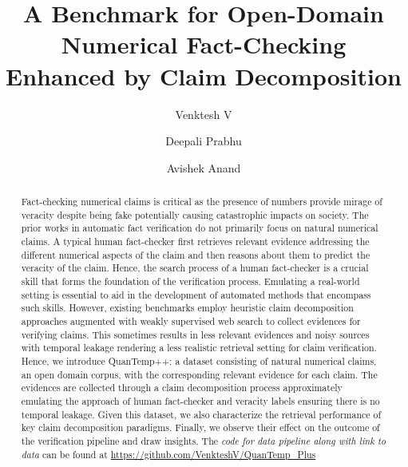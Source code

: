 \documentclass[runningheads]{llncs}
\begin{document}
%
\title{ A Benchmark for Open-Domain Numerical Fact-Checking  Enhanced by Claim Decomposition }
%
%
\author{Venktesh V \and
Deepali Prabhu \and
Avishek Anand}
%
%
%
\maketitle              %
%
\begin{abstract}
Fact-checking numerical claims is critical as the presence of numbers provide mirage of veracity despite being fake potentially causing catastrophic impacts on society. The prior works in automatic fact verification do not primarily focus on natural numerical claims. A typical human fact-checker first retrieves relevant evidence addressing the different numerical aspects of the claim and then reasons about them to predict the veracity of the claim. Hence, the search process of a human fact-checker is a crucial skill that forms the foundation of the verification process. Emulating a real-world setting is essential to aid in the development of automated methods that encompass such skills. However, existing benchmarks employ heuristic claim decomposition approaches augmented with weakly supervised web search to collect evidences for verifying claims. This sometimes results in less relevant evidences and noisy sources with temporal leakage rendering a less realistic retrieval setting for claim verification. Hence, we introduce QuanTemp++: a dataset consisting of natural numerical claims, an open domain corpus, with the corresponding relevant evidence for each claim. The evidences are collected through a claim decomposition process approximately emulating the approach of human fact-checker and veracity labels ensuring there is no temporal leakage. Given this dataset, we also characterize the retrieval performance of key claim decomposition paradigms. Finally, we observe their effect on the outcome of the verification pipeline and draw insights. The \emph{code for data pipeline along with link to data} can be found at
 \url{https://github.com/VenkteshV/QuanTemp\_Plus}

\end{abstract}
%
%
%










 
 
%
\end{document}
